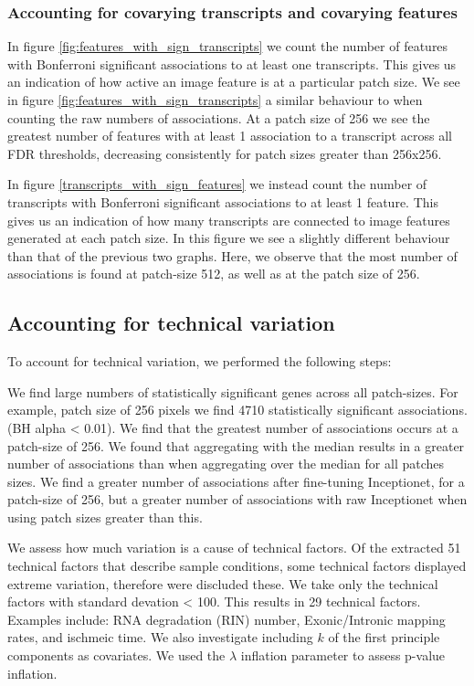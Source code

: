 \documentclass[graybox]{svmult}
\begin{document}
\subsubsection{Accounting for covarying transcripts and covarying features}

In figure \ref{fig:features_with_sign_transcripts} we count the number of features with Bonferroni significant associations to at least one transcripts. This gives us an indication of how active an image feature is at a particular patch size. We see in figure \ref{fig:features_with_sign_transcripts} a similar behaviour to when counting the raw numbers of associations. At a patch size of 256 we see the greatest number of features with at least 1 association to a transcript across all FDR thresholds, decreasing consistently for patch sizes greater than 256x256.

In figure \ref{transcripts_with_sign_features} we instead count the number of transcripts with Bonferroni significant associations to at least 1 feature. This gives us an indication of how many transcripts are connected to image features generated at each patch size. In this figure we see a slightly different behaviour than that of the previous two graphs. Here, we observe that the most number of associations is found at patch-size 512, as well as at the patch size of 256.


\subsection{Accounting for technical variation}

To account for technical variation, we performed the following steps:

We find large numbers of statistically significant genes across all patch-sizes. For example, patch size of 256 pixels we find 4710 statistically significant associations. (BH alpha < 0.01). We find that the greatest number of associations occurs at a patch-size of 256. We found that aggregating with the median results in a greater number of associations than when aggregating over the median for all patches sizes. We find a greater number of associations after fine-tuning Inceptionet, for a patch-size of 256, but a greater number of associations with raw Inceptionet when using patch sizes greater than this.
 
 
We assess how much variation is a cause of technical factors. Of the extracted 51 technical factors that describe sample conditions, some technical factors displayed extreme variation, therefore were discluded these. We take only the technical factors with standard devation < 100. This results in 29 technical factors. Examples include: RNA degradation (RIN) number, Exonic/Intronic mapping rates, and ischmeic time. We also investigate including $k$ of the first principle components as covariates. We used the $\lambda$ inflation parameter to assess p-value inflation.
 
\end{document}
